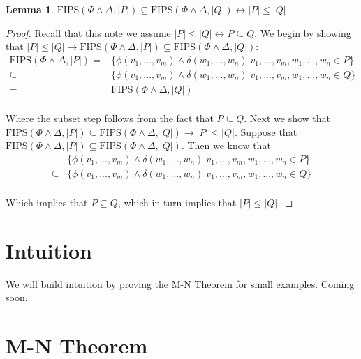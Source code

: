 \documentclass[12pt]{article}
\newtheorem{lemma}{Lemma}
\newcommand{\fips}{\text{FIPS}}
\begin{document}
\begin{lemma}
  $\fips(\Phi \land \Delta, |P|) \subseteq \fips(\Phi \land \Delta, |Q|) \leftrightarrow |P| \leq |Q|$
\end{lemma}
\begin{proof}
  Recall that this note we assume $|P| \leq |Q| \leftrightarrow P \subseteq Q$.  We begin by showing that $|P| \leq |Q| \rightarrow \fips(\Phi \land \Delta, |P|) \subseteq \fips(\Phi \land \Delta, |Q|)$:
  \begin{align*}
    \fips(\Phi \land \Delta, |P|) = &\{\phi(v_1,...,v_m) \land \delta(w_1,...,w_n) | v_1,...,v_m,w_1,...,w_n \in P\}\\
    \subseteq &\{\phi(v_1,...,v_m) \land \delta(w_1,...,w_n) | v_1,...,v_m,w_1,...,w_n \in Q\}\\
    = &\fips(\Phi \land \Delta, |Q|)\\
  \end{align*}

  Where the subset step follows from the fact that $P \subseteq Q$.  Next we show that $\fips(\Phi \land \Delta, |P|) \subseteq \fips(\Phi \land \Delta, |Q|) \rightarrow |P| \leq |Q|$.  Suppose that $\fips(\Phi \land \Delta, |P|) \subseteq \fips(\Phi \land \Delta, |Q|)$.  Then we know that 
  \begin{align*}
    &\{\phi(v_1,...,v_m) \land \delta(w_1,...,w_n) | v_1,...,v_m,w_1,...,w_n \in P\}\\
    \subseteq &\{\phi(v_1,...,v_m) \land \delta(w_1,...,w_n) | v_1,...,v_m,w_1,...,w_n \in Q\}\\
  \end{align*}

  Which implies that $P \subseteq Q$, which in turn implies that $|P| \leq |Q|$.

\end{proof}


\section{Intuition}
We will build intuition by proving the M-N Theorem for small examples.  Coming soon.


\section{M-N Theorem}
\end{document}
